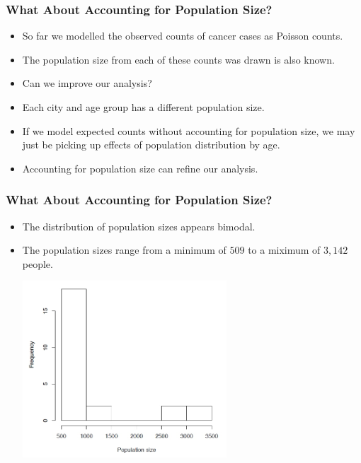 \documentclass[10pt,xcolor={svgnames},t]{beamer}
\begin{document}
\begin{frame}
	\frametitle{What About Accounting for Population Size?}
	
	\begin{itemize}
		\item So far we modelled the observed counts of cancer cases as Poisson counts.
				\bigskip
		\item The population size from each of these counts was drawn is also known.
				\bigskip
		\item Can we improve our analysis?
		\bigskip
		\item Each city and age group has a different population size.
				\bigskip
		\item If we model expected counts without accounting for population size, we may just be picking up effects of population distribution by age.
				\bigskip
		\item Accounting for population size can refine our analysis.
		
	\end{itemize}
	
	
\end{frame}
%
%
\begin{frame}
	\frametitle{What About Accounting for Population Size?}
	
	\begin{itemize}
		\item The distribution of population sizes appears bimodal.
		\item The population sizes range from a minimum of $509$ to a miximum of $3,142$ people.
		\begin{center}
			\includegraphics[width=0.6\textwidth]{dist.jpg}
		\end{center}
		
	\end{itemize}
	
	
\end{frame}
\end{document}
